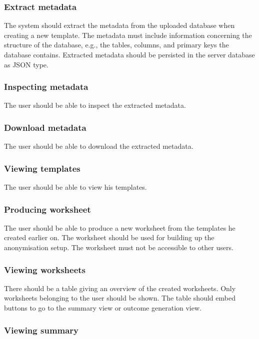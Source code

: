 \documentclass[a4paper,twoside,12pt]{book}
\begin{document}
\subsubsection{Extract metadata}

The system should extract the metadata from the uploaded database when creating a new template. The metadata must include information concerning the structure of the database, e.g., the tables, columns, and primary keys the database contains. Extracted metadata should be persisted in the server database as JSON type. 

\subsubsection{Inspecting metadata}

The user should be able to inspect the extracted metadata.

\subsubsection{Download metadata}

The user should be able to download the extracted metadata.

\subsubsection{Viewing templates}

The user should be able to view his templates.

\subsubsection{Producing worksheet}

The user should be able to produce a new worksheet from the templates he created earlier on. The worksheet should be used for building up the anonymisation setup. The worksheet must not be accessible to other users.

\subsubsection{Viewing worksheets}

There should be a table giving an overview of the created worksheets. Only worksheets belonging to the user should be shown. The table should embed buttons to go to the summary view or outcome generation view.

\subsubsection{Viewing summary}
\end{document}
